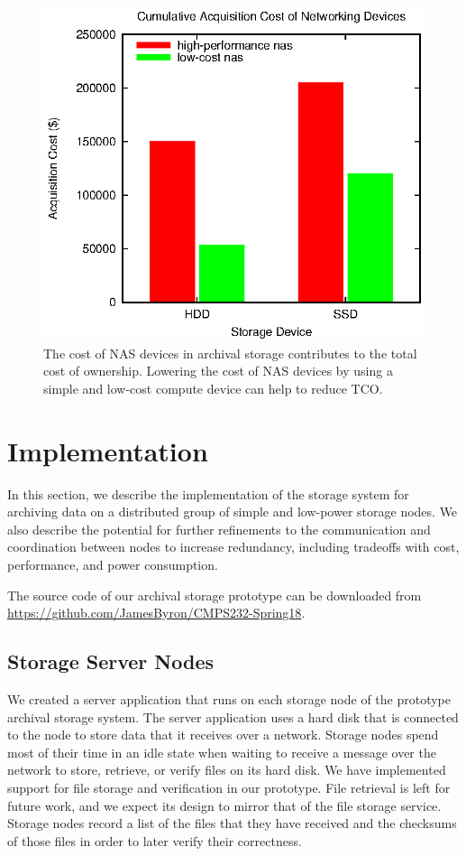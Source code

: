 \begin{figure}[!ht]
\includegraphics[width=\linewidth]{fig2.eps}
\caption{The cost of NAS devices in archival storage contributes to the total cost of ownership.  Lowering the cost of NAS devices by using a simple and low-cost compute device can help to reduce TCO.}
\label{fig2}
\end{figure}

\section{Implementation}
In this section, we describe the implementation of the storage system for archiving data on a distributed group of simple and low-power storage nodes.  We also describe the potential for further refinements to the communication and coordination between nodes to increase redundancy, including tradeoffs with cost, performance, and power consumption.

The source code of our archival storage prototype can be downloaded from \url{https://github.com/JamesByron/CMPS232-Spring18}.

\subsection{Storage Server Nodes}
We created a server application that runs on each storage node of the prototype archival storage system.  The server application uses a hard disk that is connected to the node to store data that it receives over a network.  Storage nodes spend most of their time in an idle state when waiting to receive a message over the network to store, retrieve, or verify files on its hard disk.  We have implemented support for file storage and verification in our prototype.  File retrieval is left for future work, and we expect its design to mirror that of the file storage service.  Storage nodes record a list of the files that they have received and the checksums of those files in order to later verify their correctness.

